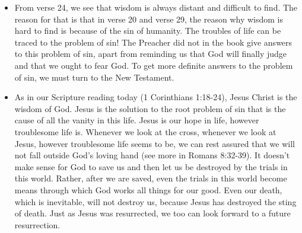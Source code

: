 \begin{itemize}
{  deliberately sin when we can avoid it, because when we deliberately sin, we
  destroy ourselves.}
  \item{From verse 24, we see that wisdom is always distant and difficult to
  find.  The reason for that is that in verse 20 and verse 29, the reason why
  wisdom is hard to find is because of the sin of humanity.  The troubles of
  life can be traced to the problem of sin!  The Preacher did not in the book
  give answers to this problem of sin, apart from reminding us that God will
  finally judge and that we ought to fear God.  To get more definite answers
  to the problem of sin, we must turn to the New Testament.}
  \item{As in our Scripture reading today (1 Corinthians 1:18-24), Jesus
  Christ is the wisdom of God.  Jesus is the solution to the root problem of
  sin that is the cause of all the vanity in this life.  Jesus is our hope in
  life, however troublesome life is.  Whenever we look at the cross, whenever
  we look at Jesus, however troublesome life seems to be, we can rest assured
  that we will not fall outside God's loving hand (see more in Romans
  8:32-39).  It doesn't make sense for God to save us and then let us be
  destroyed by the trials in this world.  Rather, after we are saved, even
  the trials in this world become means through which God works all things
  for our good.  Even our death, which is inevitable, will not destroy us,
  because Jesus has destroyed the sting of death.  Just as Jesus was
  resurrected, we too can look forward to a future resurrection.}
\end{itemize}